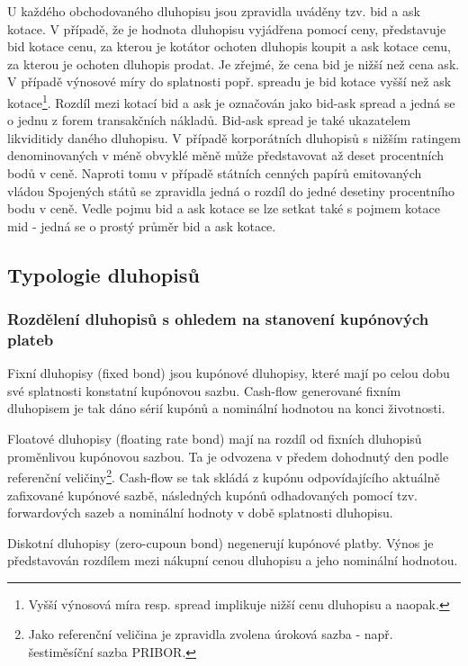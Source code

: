 \documentclass[a4paper]{book}
\begin{document}
U každého obchodovaného dluhopisu jsou zpravidla uváděny tzv. bid a ask kotace. V případě, že je hodnota dluhopisu vyjádřena pomocí ceny, představuje bid kotace cenu, za kterou je kotátor ochoten dluhopis koupit a ask kotace cenu, za kterou je ochoten dluhopis prodat. Je zřejmé, že cena bid je nižší než cena ask. V případě výnosové míry do splatnosti popř. spreadu je bid kotace vyšší než ask kotace\footnote{Vyšší výnosová míra resp. spread implikuje nižší cenu dluhopisu a naopak.}. Rozdíl mezi kotací bid a ask je označován jako bid-ask spread a jedná se o jednu z forem transakčních nákladů. Bid-ask spread je také ukazatelem likviditidy daného dluhopisu. V případě korporátních dluhopisů s nižším ratingem denominovaných v méně obvyklé měně může představovat až deset procentních bodů v ceně. Naproti tomu v případě státních cenných papírů emitovaných vládou Spojených států se zpravidla jedná o rozdíl do jedné desetiny procentního bodu v ceně. Vedle pojmu bid a ask kotace se lze setkat také s pojmem kotace mid - jedná se o prostý průměr bid a ask kotace. 

\subsection{Typologie dluhopisů}

\subsubsection{Rozdělení dluhopisů s ohledem na stanovení kupónových plateb}

Fixní dluhopisy (fixed bond) jsou kupónové dluhopisy, které mají po celou dobu své splatnosti konstatní kupónovou sazbu. Cash-flow generované fixním dluhopisem je tak dáno sérií kupónů a nominální hodnotou na konci životnosti.

Floatové dluhopisy (floating rate bond) mají na rozdíl od fixních dluhopisů proměnlivou kupónovou sazbou. Ta je odvozena v předem dohodnutý den podle referenční veličiny\footnote{Jako referenční veličina je zpravidla zvolena úroková sazba - např. šestiměsíční sazba PRIBOR.}. Cash-flow se tak skládá z kupónu odpovídajícího aktuálně zafixované kupónové sazbě, následných kupónů odhadovaných pomocí tzv. forwardových sazeb a nominální hodnoty v době splatnosti dluhopisu.

Diskotní dluhopisy (zero-cupoun bond) negenerují kupónové platby. Výnos je představován rozdílem mezi nákupní cenou dluhopisu a jeho nominální hodnotou.
\end{document}
